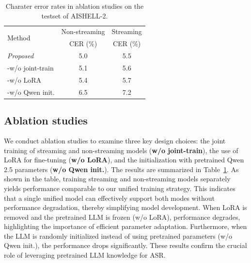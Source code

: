 \documentclass{article}
\begin{document}
\begin{table}[t!]
    \caption{Charater error rates in ablation studies 
    on the testset of AISHELL-2.}
    \label{tab:tab5}
    \centering
    \begin{tabular}{l c c}
    \hline
    \hline
     \multirow{2}{*}{Method} & Non-streaming & Streaming \\
     &  CER (\%) & CER (\%) \\
     \hline
    \emph{Proposed}     & 5.0 & 5.5 \\
    \qquad -w/o joint-train &  5.1 & 5.6 \\
    \qquad -w/o LoRA & 5.4  & 5.7  \\
    \qquad -w/o Qwen init. &  6.5   & 7.2   \\
    \hline
    \hline
    \end{tabular}

\end{table}


\subsection{Ablation studies}
\label{sec:subsecab}
We conduct ablation studies to examine three key design choices: the joint training of streaming and non-streaming models (\textbf{w/o joint-train}), the use of LoRA for fine-tuning (\textbf{w/o LoRA}), and the initialization with pretrained Qwen 2.5 parameters (\textbf{w/o Qwen init.}). The results are summarized in Table~\ref{tab:tab5}.
As shown in the table, training streaming and non-streaming models separately yields performance comparable to our unified training strategy. This indicates that a single unified model can effectively support both modes without performance degradation, thereby simplifying model development.
When LoRA is removed and the pretrained LLM is frozen (w/o LoRA), performance degrades, highlighting the importance of efficient parameter adaptation. Furthermore, when the LLM is randomly initialized instead of using pretrained parameters (w/o Qwen init.), the performance drops significantly. These results confirm the crucial role of leveraging pretrained LLM knowledge for ASR.

\end{document}
